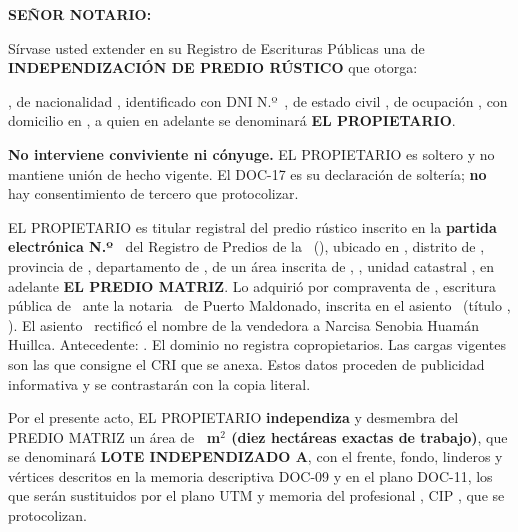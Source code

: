 \documentclass[12pt,a4paper]{article}
\begin{document}


\noindent \textbf{SEÑOR NOTARIO:}

\vspace{0.25em}
\noindent Sírvase usted extender en su Registro de Escrituras Públicas una de \textbf{INDEPENDIZACIÓN DE PREDIO RÚSTICO} que otorga:

\vspace{0.2em}
\noindent \textbf{\VendedorNombreCompleto}, de nacionalidad \VendedorNacionalidad, identificado con DNI N.º\ \VendedorDNI, de estado civil \VendedorEstadoCivil, de ocupación \VendedorOcupacion, con domicilio en \VendedorDomicilio, a quien en adelante se denominará \textbf{EL PROPIETARIO}.

\vspace{0.15em}
\noindent \textbf{No interviene conviviente ni cónyuge.} EL PROPIETARIO es soltero y no mantiene unión de hecho vigente. El DOC-17 es su declaración de soltería; \textbf{no} hay consentimiento de tercero que protocolizar.

EL PROPIETARIO es titular registral del predio rústico inscrito en la \textbf{partida electrónica N.º\ \PartidaMatriz} del Registro de Predios de la \OficinaRegistral\ (\ZonaRegistral), ubicado en \UbicacionRegistral, distrito de \Distrito, provincia de \Provincia, departamento de \Departamento, de un área inscrita de \AreaMatriz, \NombreFundo, unidad catastral \UnidadCatastral, en adelante \textbf{EL PREDIO MATRIZ}. Lo adquirió por compraventa de \VendedoresAnteriores, escritura pública de \FechaAdquisicionMatriz\ ante la notaria \NotarioAdquisicion\ de Puerto Maldonado, inscrita en el asiento \AsientoDominio\ (título \TituloSunarpDominio, \FechaInscripcionDominio). El asiento \AsientoRectificacion\ rectificó el nombre de la vendedora a Narcisa Senobia Huamán Huillca. Antecedente: \FichaAntecedente. El dominio no registra copropietarios. Las cargas vigentes son las que consigne el CRI que se anexa. Estos datos proceden de publicidad informativa y se contrastarán con la copia literal.

Por el presente acto, EL PROPIETARIO \textbf{independiza} y desmembra del PREDIO MATRIZ un área de \textbf{\AreaIndependizarMetros\ m$^2$ (diez hectáreas exactas de trabajo)}, que se denominará \textbf{LOTE INDEPENDIZADO A}, con el frente, fondo, linderos y vértices descritos en la memoria descriptiva DOC-09 y en el plano DOC-11, los que serán sustituidos por el plano UTM y memoria del profesional \IngenieroNombre, CIP \IngenieroCIP, que se protocolizan.
\end{document}
